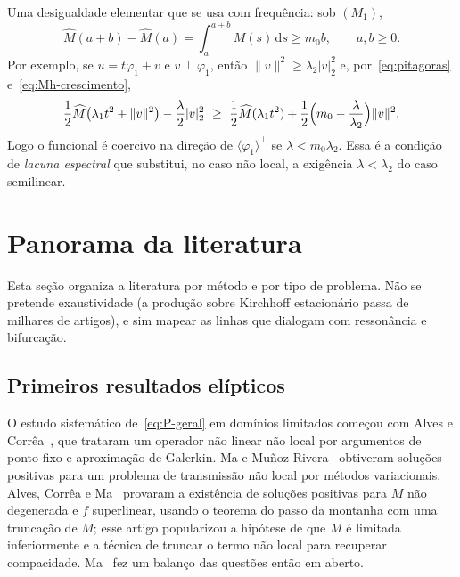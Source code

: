 \documentclass[11pt,a4paper]{article}
\theoremstyle{plain}
\theoremstyle{definition}
\theoremstyle{remark}
\newcommand{\norm}[1]{\lVert #1\rVert}
\newcommand{\abs}[1]{\lvert #1\rvert}
\newcommand{\Mh}{\widehat{M}}
\begin{document}
Uma desigualdade elementar que se usa com frequência: sob $(M_1)$,
\begin{equation}\label{eq:Mh-crescimento}
\Mh(a+b)-\Mh(a)=\int_a^{a+b}M(s)\,\mathrm{d}s\ge m_0b,\qquad a,b\ge0.
\end{equation}
Por exemplo, se $u=t\varphi_1+v$ e $v\perp\varphi_1$, então
$\norm{v}^2\ge\lambda_2\abs{v}_2^2$ e, por~\eqref{eq:pitagoras}
e~\eqref{eq:Mh-crescimento},
\begin{equation}\label{eq:coercividade-v}
\frac12\Mh\bigl(\lambda_1t^2+\norm{v}^2\bigr)-\frac{\lambda}{2}\abs{v}_2^2
\ \ge\ \frac12\Mh(\lambda_1t^2)+\frac12\Bigl(m_0-\frac{\lambda}{\lambda_2}\Bigr)\norm{v}^2 .
\end{equation}
Logo o funcional é coercivo na direção de $\langle\varphi_1\rangle^\perp$ se
$\lambda<m_0\lambda_2$. Essa é a condição de \emph{lacuna espectral} que
substitui, no caso não local, a exigência $\lambda<\lambda_2$ do caso
semilinear.

\section{Panorama da literatura}\label{sec:panorama}

Esta seção organiza a literatura por método e por tipo de problema. Não se
pretende exaustividade (a produção sobre Kirchhoff estacionário passa de
milhares de artigos), e sim mapear as linhas que dialogam com ressonância e
bifurcação.

\subsection{Primeiros resultados elípticos}

O estudo sistemático de~\eqref{eq:P-geral} em domínios limitados começou com
Alves e Corrêa~\cite{AlvesCorrea2001}, que trataram um operador não linear não
local por argumentos de ponto fixo e aproximação de Galerkin. Ma e Muñoz
Rivera~\cite{MaRivera2003} obtiveram soluções positivas para um problema de
transmissão não local por métodos variacionais. Alves, Corrêa e
Ma~\cite{AlvesCorreaMa2005} provaram a existência de soluções positivas para
$M$ não degenerada e $f$ superlinear, usando o teorema do passo da montanha com
uma truncação de $M$; esse artigo popularizou a hipótese de que $M$ é limitada
inferiormente e a técnica de truncar o termo não local para recuperar
compacidade. Ma~\cite{Ma2005} fez um balanço das questões então em aberto.
\end{document}
